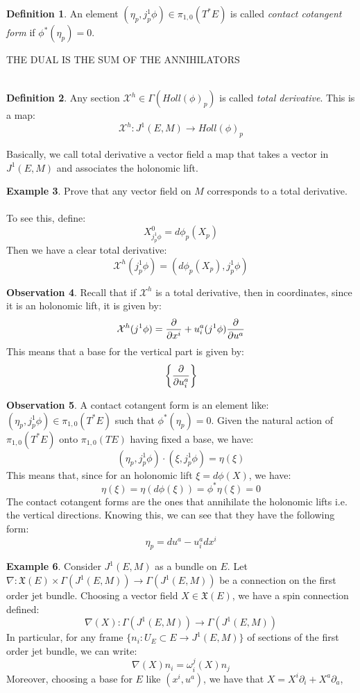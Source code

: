 \documentclass[12pt,a4paper]{report}
\theoremstyle{definition}
\newtheorem{Def}{Definition}[chapter]
\theoremstyle{Theorem}
\theoremstyle{definition}
\newtheorem{Ex}[Def]{Example}
\theoremstyle{definition}
\newtheorem{Obs}[Def]{Observation}
\begin{document}
	\begin{Def}
		An element $(\eta_p,j^1_p\phi)\in \pi_{1,0}(T^*E)$ is called \textit{contact cotangent form} if $\phi^*(\eta_p)=0$.
	\end{Def}
	THE DUAL IS THE SUM OF THE ANNIHILATORS\\\\
	\begin{Def}
		Any section $\mathcal{X}^h\in\Gamma(Holl(\phi)_p)$ is called \textit{total derivative}.
		This is a map:
		$$\mathcal{X}^h:J^1(E,M)\rightarrow Holl(\phi)_p$$
	\end{Def}
	Basically, we call total derivative a vector field a map that takes a vector in $J^1(E,M)$ and associates the holonomic lift.
	\begin{Ex}
		Prove that any vector field on $M$ corresponds to a total derivative.\\
		\\
		To see this, define:
		$$X^0_{j^1_p\phi}=d\phi_p(X_p)$$
		Then we have a clear total derivative:
		$$\mathcal{X}^h(j^1_p\phi)=(d\phi_p(X_p),j^1_p\phi)$$
	\end{Ex}
	\begin{Obs}
		Recall that if $\mathcal{X}^h$ is a total derivative, then in coordinates, since it is an holonomic lift, it is given by:
		$$\mathcal{X}^h(j^1\phi)={\partial\over \partial x^i}+u_i^a(j^1\phi){\partial\over \partial u^a}$$
		This means that a base for the vertical part is given by:
		$$\bigg\{{\partial\over\partial u^a_i}\bigg\}$$
	\end{Obs}
	\begin{Obs}
		A contact cotangent form is an element like: $(\eta_p,j^1_p\phi)\in \pi_{1,0}(T^*E)$ such that $\phi^*(\eta_p)=0$. Given the natural action of $\pi_{1,0}(T^*E)$ onto $\pi_{1,0}(TE)$ having fixed a base, we have:
		$$(\eta_p,j^1_p\phi)\cdot (\xi,j^1_p\phi)=\eta(\xi)$$
		This means that, since for an holonomic lift $\xi=d\phi(X)$, we have:
		$$\eta(\xi)=\eta(d\phi(\xi))=\phi^*\eta(\xi)=0$$
		The contact cotangent forms are the ones that annihilate the holonomic lifts i.e. the vertical directions. Knowing this, we can see that they have the following form:
		$$\eta_p=du^a-u^a_idx^i$$
	\end{Obs}
	\begin{Ex}
		Consider $J^1(E,M)$ as a bundle on $E$.
		Let $\nabla:\mathfrak{X}(E)\times \Gamma(J^1(E,M))\rightarrow \Gamma(J^1(E,M))$ be a connection on the first order jet bundle. Choosing a vector field $X\in\mathfrak{X}(E)$, we have a spin connection defined:
		$$\nabla(X):\Gamma(J^1(E,M))\rightarrow \Gamma(J^1(E,M))$$
		In particular, for any frame $\{n_i:U_E\subset E\rightarrow J^1(E,M)\}$ of sections of the first order jet bundle, we can write:
		$$\nabla(X)n_i=\omega^j_i(X)n_j$$
		Moreover, choosing a base for $E$ like $(x^i,u^a)$, we have that $X=X^i\partial_i+X^a\partial_a$,
	\end{Ex}
\end{document}
